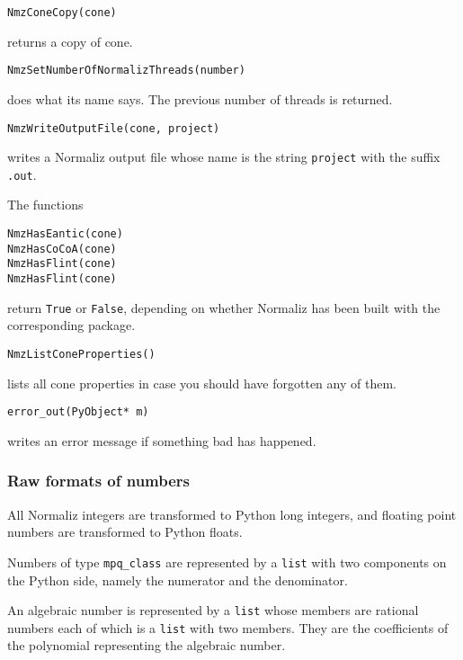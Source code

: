 \documentclass[12pt,a4paper]{scrartcl}
\theoremstyle{definition}
\begin{document}
\begin{small}
\begin{Verbatim}
NmzConeCopy(cone)
\end{Verbatim}
returns a copy of cone.

\begin{Verbatim}
NmzSetNumberOfNormalizThreads(number)
\end{Verbatim}
does what its name says. The previous number of threads is returned.

\begin{Verbatim}
NmzWriteOutputFile(cone, project)
\end{Verbatim}
writes a Normaliz output file whose name is the string \verb|project| with the suffix \verb|.out|.


The functions
\begin{Verbatim}
NmzHasEantic(cone)
NmzHasCoCoA(cone)
NmzHasFlint(cone)
NmzHasFlint(cone)
\end{Verbatim}
return \verb|True| or \verb|False|, depending on whether Normaliz has been built with the corresponding package.

\begin{Verbatim}
NmzListConeProperties() 
\end{Verbatim}
lists all cone properties in case you should have forgotten any of them.

\begin{Verbatim}
error_out(PyObject* m)
\end{Verbatim}
writes an error message if something bad has happened.

\subsubsection{Raw formats of numbers}

All Normaliz integers are transformed to Python long integers, and floating point numbers are transformed to Python floats.

Numbers of type \verb|mpq_class| are represented by a \verb|list| with two components on the Python side, namely the numerator and the denominator.

An algebraic number is represented by a \verb|list| whose members are rational numbers each of which is a \verb|list| with two members. They are the coefficients of the polynomial representing the algebraic number.

\end{small}

\newpage
\end{document}
